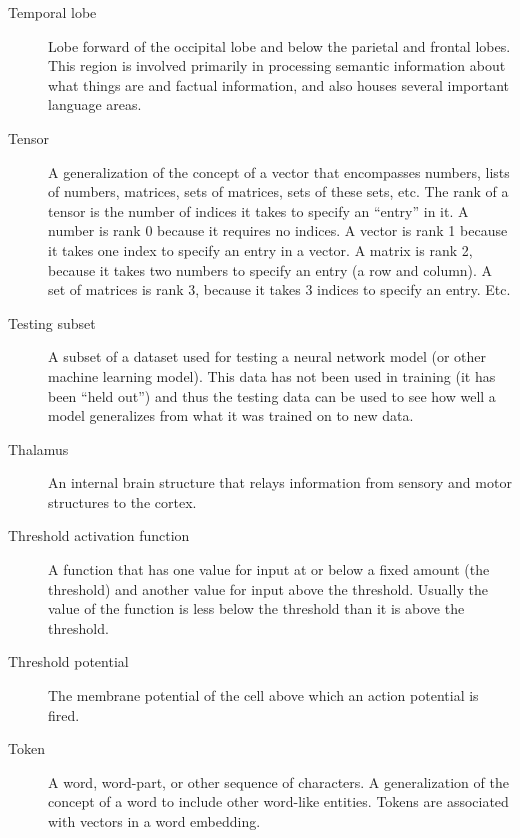 \begin{description}
\item[Temporal lobe] Lobe forward of the occipital lobe and below the parietal and frontal lobes. This region is involved primarily in processing semantic information about what things are and factual information, and also houses several important language areas.

\item[Tensor] A generalization of the concept of a vector that encompasses numbers, lists of numbers, matrices, sets of matrices, sets of these sets, etc. The rank of a tensor is the number of indices it takes to specify an ``entry'' in it.  A number is rank 0 because it requires no indices. A vector is rank 1 because it takes one index to specify an entry in a vector. A matrix is rank 2, because it takes two numbers to specify an entry (a row and column). A set of matrices is rank 3, because it takes 3 indices to specify an entry. Etc.

\item[Testing subset] A subset of a dataset used for testing a neural network model (or other machine learning model). This data has not been used in training (it has been ``held out'') and thus the testing data can be used to see how well a model generalizes from what it was trained on to new data.

\item[Thalamus] An internal brain structure that relays information from sensory and motor structures to the cortex.

\item[Threshold activation function] A function that has one value for input at or below a fixed amount (the threshold) and another value for input above the threshold. Usually the value of the function is less below the threshold than it is above the threshold.

\item[Threshold potential] The membrane potential of the cell above which an action potential is fired.

\item[Token] A word, word-part, or other sequence of characters. A generalization of the concept of a word to include other word-like entities. Tokens are associated with vectors in a word embedding.



\end{description}
